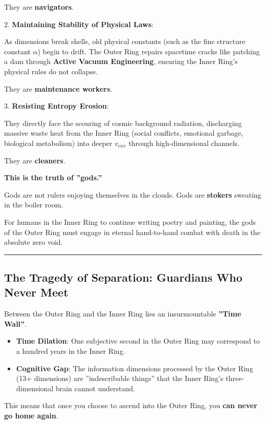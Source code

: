     They are \textbf{navigators}.

2.  \textbf{Maintaining Stability of Physical Laws}:

    As dimensions break shells, old physical constants (such as the fine structure constant $\alpha$) begin to drift. The Outer Ring repairs spacetime cracks like patching a dam through \textbf{Active Vacuum Engineering}, ensuring the Inner Ring's physical rules do not collapse.

    They are \textbf{maintenance workers}.

3.  \textbf{Resisting Entropy Erosion}:

    They directly face the scouring of cosmic background radiation, discharging massive waste heat from the Inner Ring (social conflicts, emotional garbage, biological metabolism) into deeper $v_{env}$ through high-dimensional channels.

    They are \textbf{cleaners}.

\textbf{This is the truth of ''gods.''}

Gods are not rulers enjoying themselves in the clouds. Gods are \textbf{stokers} sweating in the boiler room.

For humans in the Inner Ring to continue writing poetry and painting, the gods of the Outer Ring must engage in eternal hand-to-hand combat with death in the absolute zero void.

\hrule

\subsection{The Tragedy of Separation: Guardians Who Never Meet}

Between the Outer Ring and the Inner Ring lies an insurmountable \textbf{''Time Wall''}.

\begin{itemize}
\item \textbf{Time Dilation}: One subjective second in the Outer Ring may correspond to a hundred years in the Inner Ring.

\item \textbf{Cognitive Gap}: The information dimensions processed by the Outer Ring (13+ dimensions) are ''indescribable things'' that the Inner Ring's three-dimensional brain cannot understand.
\end{itemize}

This means that once you choose to ascend into the Outer Ring, you \textbf{can never go home again}.

